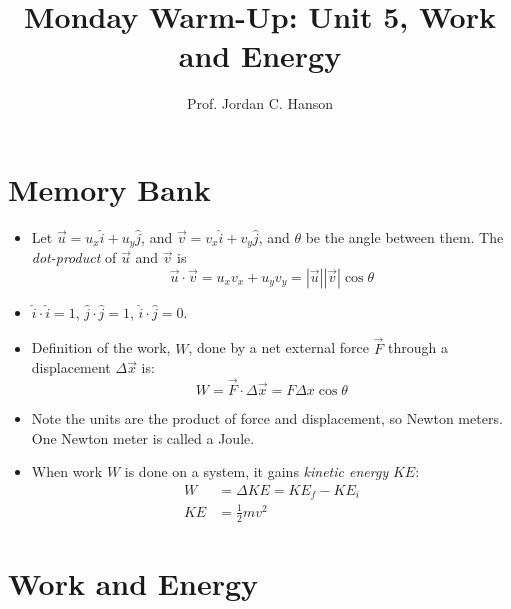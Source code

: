 \documentclass{article}
\begin{document}
\twocolumn

\title{Monday Warm-Up: Unit 5, Work and Energy}
\author{Prof. Jordan C. Hanson}

\maketitle

\section{Memory Bank}

\begin{itemize}
\item Let $\vec{u} = u_x \hat{i} + u_y \hat{j}$, and $\vec{v} = v_x \hat{i} + v_y \hat{j}$, and $\theta$ be the angle between them.  The \textit{dot-product} of $\vec{u}$ and $\vec{v}$ is
\begin{equation}
\vec{u} \cdot \vec{v} = u_x v_x + u_y v_y = |\vec{u}||\vec{v}|\cos\theta
\end{equation}
\item $\hat{i} \cdot \hat{i} = 1$, $\hat{j} \cdot \hat{j} = 1$, $\hat{i} \cdot \hat{j} = 0$.
\item Definition of the work, $W$, done by a net external force $\vec{F}$ through a displacement $\Delta\vec{x}$ is:
\begin{equation}
W = \vec{F} \cdot \Delta \vec{x} = F \Delta x \cos\theta
\end{equation}
\item Note the units are the product of force and displacement, so Newton meters.  One Newton meter is called a Joule.
\item When work $W$ is done on a system, it gains \textit{kinetic energy} $KE$:
\begin{align}
W &= \Delta KE = KE_f - KE_i \\
KE &= \frac{1}{2} m v^2
\end{align}
\end{itemize}

\section{Work and Energy}
\end{document}
